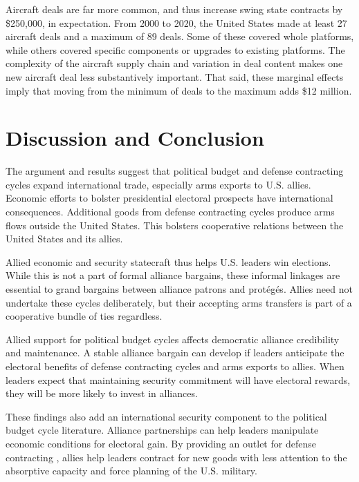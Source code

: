 \documentclass[12pt]{article}
\begin{document}
Aircraft deals are far more common, and thus increase swing state contracts by \$250,000, in expectation. 
From 2000 to 2020, the United States made at least 27 aircraft deals and a maximum of 89 deals. 
Some of these covered whole platforms, while others covered specific components or upgrades to existing platforms. 
The complexity of the aircraft supply chain and variation in deal content makes one new aircraft deal less substantively important.
That said, these marginal effects imply that moving from the minimum of deals to the maximum adds \$12 million. 




\section{Discussion and Conclusion}


The argument and results suggest that political budget and defense contracting cycles expand international trade, especially arms exports to U.S. allies. 
Economic efforts to bolster presidential electoral prospects have international consequences. 
Additional goods from defense contracting cycles produce arms flows outside the United States.
This bolsters cooperative relations between the United States and its allies.


Allied economic and security statecraft thus helps U.S. leaders win elections. 
While this is not a part of formal alliance bargains, these informal linkages are essential to grand bargains between alliance patrons and prot{\'e}g{\'e}s.
Allies need not undertake these cycles deliberately, but their accepting arms transfers is part of a cooperative bundle of ties regardless.


Allied support for political budget cycles affects democratic alliance credibility and maintenance. 
A stable alliance bargain can develop if leaders anticipate the electoral benefits of defense contracting cycles and arms exports to allies.
When leaders expect that maintaining security commitment will have electoral rewards, they will be more likely to invest in alliances. 


These findings also add an international security component to the political budget cycle literature.
Alliance partnerships can help leaders manipulate economic conditions for electoral gain. 
By providing an outlet for defense contracting , allies help leaders contract for new goods with less attention to the absorptive capacity and force planning of the U.S. military.
\end{document}
